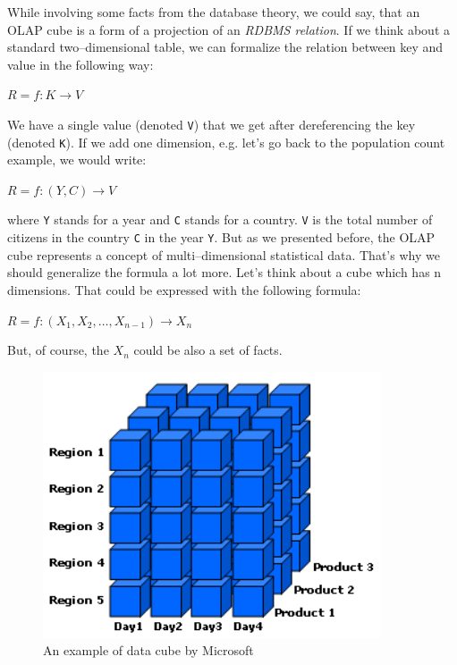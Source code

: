While involving some facts from the database theory, we could say, that an OLAP cube is a form
of a projection of an \emph{RDBMS relation}. If we think about a standard two--dimensional table, we can
formalize the relation between key and value in the following way:

\begin{center}
$R = f: K \rightarrow V$
\end{center}

We have a single value (denoted \texttt{V}) that we get after dereferencing the key (denoted \texttt{K}).
If we add one dimension, e.g. let’s go back to the population count example, we would write:

\begin{center}
$R = f: (Y,C) \rightarrow V$
\end{center}

where \texttt{Y} stands for a year and \texttt{C} stands for a country. \texttt{V} is the total number of
citizens in the country \texttt{C} in the year \texttt{Y}.
But as we presented before, the OLAP cube represents a concept of
multi--dimensional statistical data. That’s why we should generalize the formula a lot more.
Let’s think about a cube which has n dimensions. That could be expressed with the following
formula:

\begin{center}
$R = f: (X_{1}, X_{2}, …, X_{n-1}) \rightarrow X_{n}$
\end{center}

But, of course, the $X_{n}$ could be also a set of facts.


\begin{figure}
	\centering
	\includegraphics[width=100mm]{img/data-cube.png}
	\caption{An example of data cube by Microsoft~\cite{msdn-cube}}
	\label{fig:lod-cloud}
\end{figure}

